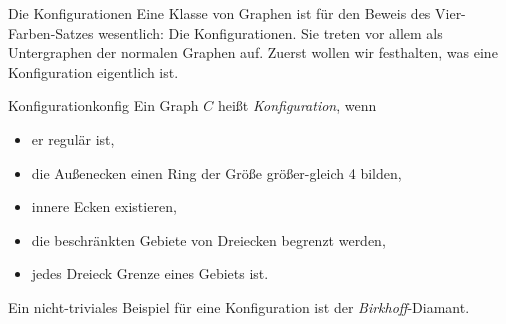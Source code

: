   \begin{section}{Die Konfigurationen}
   Eine Klasse von Graphen ist für den Beweis des Vier-Farben-Satzes wesentlich: Die Konfigurationen. Sie treten vor allem als Untergraphen der normalen Graphen auf. Zuerst wollen wir festhalten, was eine Konfiguration eigentlich ist.
   
   \begin{definitionl}{Konfiguration}{konfig}
    Ein Graph $C$ heißt \textit{Konfiguration}, wenn
    \begin{itemize}
     \item er regulär ist,
     \item die Außenecken einen Ring der Größe größer-gleich 4 bilden,
     \item innere Ecken existieren,
     \item die beschränkten Gebiete von Dreiecken begrenzt werden,
     \item jedes Dreieck Grenze eines Gebiets ist.
    \end{itemize}
   \end{definitionl}
   
   Ein nicht-triviales Beispiel für eine Konfiguration ist der \textit{Birkhoff}-Diamant.
   
  \end{section}
\newpage